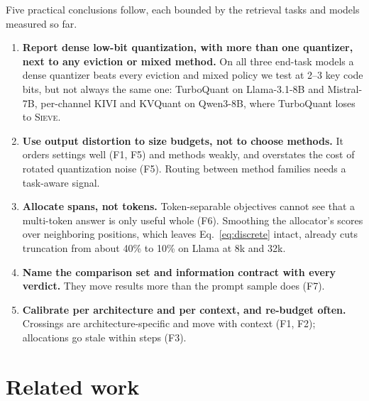 \documentclass{article}
\newcommand{\sieve}{\textsc{Sieve}}
\theoremstyle{definition}
\begin{document}
Five practical conclusions follow, each bounded by the retrieval tasks and models measured so far.
\begin{enumerate}[leftmargin=*,itemsep=1pt,topsep=2pt]
  \item \textbf{Report dense low-bit quantization, with more than one quantizer, next to any eviction or mixed method.}  On all three end-task models a dense quantizer beats every eviction and mixed policy we test at 2--3 key code bits, but not always the same one: TurboQuant on Llama-3.1-8B and Mistral-7B, per-channel KIVI and KVQuant on Qwen3-8B, where TurboQuant loses to \sieve{}.
  \item \textbf{Use output distortion to size budgets, not to choose methods.}  It orders settings well (F1, F5) and methods weakly, and overstates the cost of rotated quantization noise (F5).  Routing between method families needs a task-aware signal.
  \item \textbf{Allocate spans, not tokens.}  Token-separable objectives cannot see that a multi-token answer is only useful whole (F6).  Smoothing the allocator's scores over neighboring positions, which leaves Eq.~\ref{eq:discrete} intact, already cuts truncation from about 40\% to 10\% on Llama at 8k and 32k.
  \item \textbf{Name the comparison set and information contract with every verdict.}  They move results more than the prompt sample does (F7).
  \item \textbf{Calibrate per architecture and per context, and re-budget often.}  Crossings are architecture-specific and move with context (F1, F2); allocations go stale within steps (F3).
\end{enumerate}


\section{Related work}
\label{sec:related}
\end{document}
